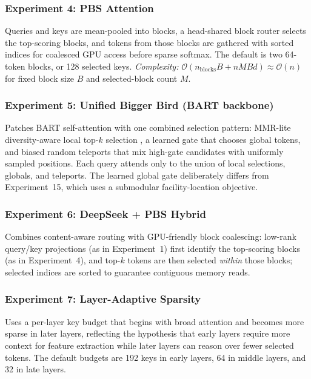 \documentclass[11pt]{article}
\newcommand{\bigO}{\mathcal{O}}
\begin{document}
\subsubsection*{Experiment 4: PBS Attention}
\label{exp:pbs}
Queries and keys are mean-pooled into blocks, a head-shared block router
selects the top-scoring blocks, and tokens from those blocks are gathered with
sorted indices for coalesced GPU access before sparse softmax. The default is
two 64-token blocks, or 128 selected keys. \emph{Complexity:}
$\bigO(n_{\mathrm{blocks}}B+nMBd)\approx\bigO(n)$ for fixed block size $B$
and selected-block count $M$.

\subsubsection*{Experiment 5: Unified Bigger Bird (BART backbone)}
\label{exp:unified-bb}
Patches BART self-attention with one combined selection pattern: MMR-lite
diversity-aware local top-$k$ selection \citep{carbonell1998mmr}, a learned
gate that chooses global tokens, and biased random teleports that mix
high-gate candidates with uniformly sampled positions. Each query attends
only to the union of local selections, globals, and teleports. The learned
global gate deliberately differs from Experiment~15, which uses a submodular
facility-location objective.

\subsubsection*{Experiment 6: DeepSeek + PBS Hybrid}
\label{exp:deepseekpbs}
Combines content-aware routing with GPU-friendly block coalescing: low-rank
query/key projections (as in Experiment~1) first identify the top-scoring
blocks (as in Experiment~4), and top-$k$ tokens are then selected \emph{within}
those blocks; selected indices are sorted to guarantee contiguous memory
reads.

\subsubsection*{Experiment 7: Layer-Adaptive Sparsity}
\label{exp:layer-adaptive}
Uses a per-layer key budget that begins with broad attention and becomes more
sparse in later layers, reflecting the hypothesis that early layers require
more context for feature extraction while later layers can reason over fewer
selected tokens. The default budgets are 192 keys in early layers, 64 in
middle layers, and 32 in late layers.
\end{document}
